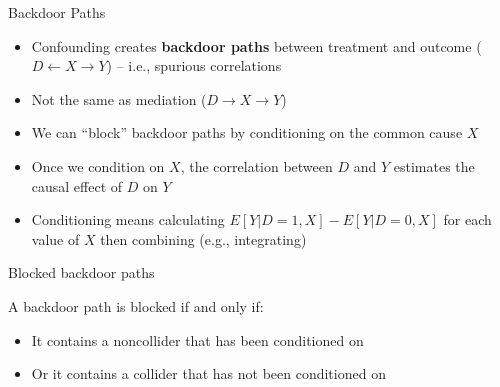 \documentclass{beamer}
\begin{document}
\begin{frame}{Backdoor Paths}

  \begin{itemize}
    \item Confounding creates \textbf{backdoor paths} between treatment and outcome ($D\leftarrow X\rightarrow Y$) -- i.e., spurious correlations
    \item Not the same as mediation ($D \rightarrow X \rightarrow Y$)
    \item We can ``block'' backdoor paths by conditioning on the common cause $X$
    \item Once we condition on $X$, the correlation between $D$ and $Y$ estimates the causal effect of $D$ on $Y$
    \item Conditioning means calculating $E[Y|D=1,X]-E[Y|D=0,X]$ for each value of $X$ then combining (e.g., integrating)

  \end{itemize}

  \begin{center}
  \end{center}

\end{frame}


\begin{frame}{Blocked backdoor paths}

  A backdoor path is blocked if and only if:
  \begin{itemize}
    \item It contains a noncollider that has been conditioned on
    \item Or it contains a collider that has not been conditioned on
  \end{itemize}

\end{frame}
\end{document}
